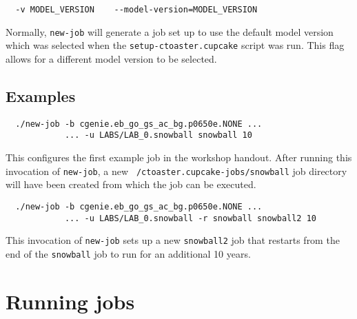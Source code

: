 \documentclass[a4paper,10pt,article]{memoir}
\begin{document}
\begin{verbatim}
  -v MODEL_VERSION    --model-version=MODEL_VERSION
\end{verbatim}
Normally, \texttt{new-job} will generate a job set up to use the
default model version which was selected when the
\texttt{setup-ctoaster.cupcake} script was run.  This flag allows for a
different model version to be selected.

\subsection*{Examples}

\begin{verbatim}
  ./new-job -b cgenie.eb_go_gs_ac_bg.p0650e.NONE ...
            ... -u LABS/LAB_0.snowball snowball 10
\end{verbatim}
This configures the first example job in the workshop handout.  After
running this invocation of \texttt{new-job}, a new
\texttt{~/ctoaster.cupcake-jobs/snowball} job directory will have been created
from which the job can be executed.

\begin{verbatim}
  ./new-job -b cgenie.eb_go_gs_ac_bg.p0650e.NONE ...
            ... -u LABS/LAB_0.snowball -r snowball snowball2 10
\end{verbatim}
This invocation of \texttt{new-job} sets up a new \texttt{snowball2}
job that restarts from the end of the \texttt{snowball} job to run for
an additional 10 years.

\section{Running jobs}
\end{document}
